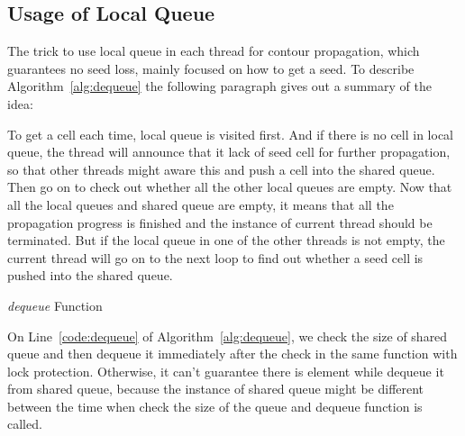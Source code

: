 \documentclass[11pt, b5paper]{report}
\begin{document}

\subsection{Usage of Local Queue}

The trick to use local queue in each thread for contour propagation, which 
guarantees no seed loss, mainly focused on how to get a seed. To describe 
Algorithm~\ref{alg:dequeue} the following paragraph gives out a summary of 
the idea:

To get a cell each time, local queue is visited first. And if there is no 
cell in local queue, the thread will announce that it lack of seed cell for
further propagation, so that other threads might aware this and push a cell 
into the shared queue. Then go on to check out whether all the other local
queues are empty. Now that all the local queues and shared queue are empty,
it means that all the propagation progress is finished and the instance
of current thread should be terminated. But if the local queue in one of the 
other threads is not empty, the current thread will go on to the next loop
to find out whether a seed cell is pushed into the shared queue.

\begin{algorithm}[htb]
  \caption[Dequeue function]{\emph{dequeue} Function\label{alg:dequeue}}
  \SetLine
\end{algorithm}

On Line~\ref{code:dequeue} of Algorithm~\ref{alg:dequeue}, we check the size of
shared queue and then dequeue it immediately after the check in the same 
function with lock protection. Otherwise, it can't guarantee there is element
while dequeue it from shared queue, because the instance of shared queue might
be different between the time when check the size of the queue and dequeue
function is called.
\end{document}
